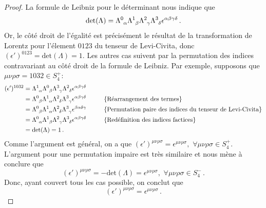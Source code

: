 \documentclass{article}
\numberwithin{equation}{section}
\theoremstyle{solution}
\begin{document}
\begin{proof}
La formule de Leibniz pour le déterminant nous indique que
\begin{equation}\label{eq:Leibniz}
        \mathrm{det}(\Lambda) = \Lambda\indices{^{0}_{\alpha}}\Lambda\indices{^{1}_{\beta}}\Lambda\indices{^{2}_{\gamma}}\Lambda\indices{^{3}_{\delta}}\epsilon^{\alpha\beta\gamma\delta}\, .
\end{equation} 
Or, le côté droit de l'égalité est précisément le résultat de la transformation de Lorentz pour l'élement $0123$ du tenseur de Levi-Civita, 
donc $(\epsilon')^{0123} = \mathrm{det}(\Lambda) = 1$. 
Les autres cas suivent par la permutation des indices contravariant au côté droit de la formule de Leibniz. 
Par exemple, supposons que $\mu\nu\rho\sigma = 1032 \in S_4^{+}$:
\begin{align*}
        (\epsilon')^{1032} &= \Lambda\indices{^{1}_{\alpha}}\Lambda\indices{^{0}_{\beta}}\Lambda\indices{^{3}_{\gamma}}\Lambda\indices{^{2}_{\delta}}\epsilon^{\alpha\beta\gamma\delta}\\
                           &= \Lambda\indices{^{0}_{\beta}}\Lambda\indices{^{1}_{\alpha}}\Lambda\indices{^{2}_{\delta}}\Lambda\indices{^{3}_{\gamma}}\epsilon^{\alpha\beta\gamma\delta}  \hspace{1cm} \{\text{Réarrangement des termes}\} \\
               &= \Lambda\indices{^{0}_{\beta}}\Lambda\indices{^{1}_{\alpha}}\Lambda\indices{^{2}_{\delta}}\Lambda\indices{^{3}_{\gamma}}\epsilon^{\beta\alpha\delta\gamma}  \hspace{1cm} \{\text{Permutation paire des indices du tenseur de Levi-Civita} \} \\
               &= \Lambda\indices{^{0}_{\alpha}}\Lambda\indices{^{1}_{\beta}}\Lambda\indices{^{2}_{\gamma}}\Lambda\indices{^{3}_{\delta}}\epsilon^{\alpha\beta\gamma\delta}  \hspace{1cm} \{\text{Redéfinition des indices factices} \} \\
               &= \mathrm{det}(\Lambda) = 1\, .\\ 
\end{align*} 
Comme l'argument est général, on a que $(\epsilon')^{\mu\nu\rho\sigma} = \epsilon^{\mu\nu\rho\sigma},\,\, \forall \mu\nu\rho\sigma \in S_4^{+}$.
L'argument pour une permutation impaire est très similaire et nous mène à conclure que 
\begin{equation}
(\epsilon')^{\mu\nu\rho\sigma} = -\mathrm{det}(\Lambda) = \epsilon^{\mu\nu\rho\sigma}, \,\, \forall \mu\nu\rho\sigma \in S_4^{-}\, .
\end{equation} 
Donc, ayant couvert tous les cas possible, on conclut que
\begin{equation}
        (\epsilon')^{\mu\nu\rho\sigma} = \epsilon^{\mu\nu\rho\sigma}\, .
\end{equation} 
\end{proof}
        
\end{document}
